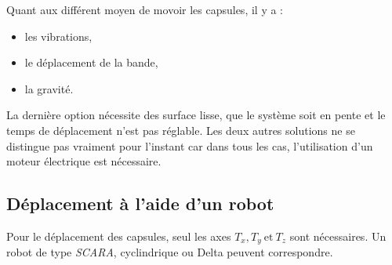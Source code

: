 Quant aux différent moyen de movoir les capsules, il y a : 
\begin{itemize}
    \item les vibrations, 
    \item le déplacement de la bande, 
    \item la gravité.
\end{itemize}

La dernière option nécessite des surface lisse, que le système soit en pente et le temps de déplacement n'est pas réglable. Les deux autres solutions ne se distingue pas vraiment pour l'instant car dans tous les cas, l'utilisation d'un moteur électrique est nécessaire.

\subsection*{Déplacement à l'aide d'un robot}
Pour le déplacement des capsules, seul les axes $T_x, T_y~\text{et}~T_z$ sont nécessaires. Un robot de type \textit{SCARA}, cyclindrique ou Delta peuvent correspondre.

